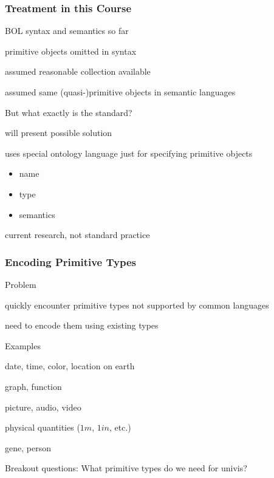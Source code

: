 \begin{frame}\frametitle{Treatment in this Course}
\begin{blockitems}{BOL syntax and semantics so far}
\item primitive objects omitted in syntax
\item assumed reasonable collection available
\item assumed same (quasi-)primitive objects in semantic languages
\end{blockitems}

\begin{blockitems}{But what exactly is the standard?}
\item will present possible solution
\item uses special ontology language just for specifying primitive objects
  \begin{itemize}
   \item name
   \item type
   \item semantics
  \end{itemize}
\item current research, not standard practice
\end{blockitems}
\end{frame}

\begin{frame}\frametitle{Encoding Primitive Types}
\begin{blockitems}{Problem}
 \item quickly encounter primitive types not supported by common languages
 \item need to encode them using existing types
\end{blockitems}

\begin{blockitems}{Examples}
\item date, time, color, location on earth
\item graph, function
\item picture, audio, video
\item physical quantities ($1m$, $1in$, etc.)
\item gene, person
\end{blockitems}

\begin{center}
Breakout questions: What primitive types do we need for univis?
\end{center}
\end{frame}

